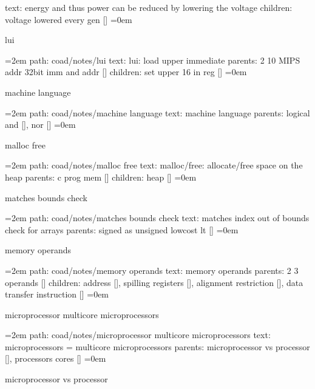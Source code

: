 text:  energy and thus power can be reduced by lowering the voltage
\smallskip
children: voltage lowered every gen []
\smallskip
\leftskip=0em
\par\endgroup
\bigskip
{}
lui
\smallskip
\par\begingroup
\leftskip=2em
path: coad/notes/lui
\smallskip
text:  lui: load upper immediate
\smallskip
parents:  2 10 MIPS addr 32bit imm and addr []
\smallskip
children: set upper 16 in reg []
\smallskip
\leftskip=0em
\par\endgroup
\bigskip
{}
machine language
\smallskip
\par\begingroup
\leftskip=2em
path: coad/notes/machine language
\smallskip
text:  machine language
\smallskip
parents:  logical and [], nor []
\smallskip
\leftskip=0em
\par\endgroup
\bigskip
{}
malloc free
\smallskip
\par\begingroup
\leftskip=2em
path: coad/notes/malloc free
\smallskip
text:  malloc/free: allocate/free space on the heap
\smallskip
parents:  c prog mem []
\smallskip
children: heap []
\smallskip
\leftskip=0em
\par\endgroup
\bigskip
{}
matches bounds check
\smallskip
\par\begingroup
\leftskip=2em
path: coad/notes/matches bounds check
\smallskip
text:  matches index out of bounds check for arrays
\smallskip
parents:  signed as unsigned lowcost lt []
\smallskip
\leftskip=0em
\par\endgroup
\bigskip
{}
memory operands
\smallskip
\par\begingroup
\leftskip=2em
path: coad/notes/memory operands
\smallskip
text:  memory operands
\smallskip
parents:  2 3 operands []
\smallskip
children: address [], spilling registers [], alignment restriction [], data transfer instruction []
\smallskip
\leftskip=0em
\par\endgroup
\bigskip
{}
microprocessor multicore microprocessors
\smallskip
\par\begingroup
\leftskip=2em
path: coad/notes/microprocessor multicore microprocessors
\smallskip
text:  microprocessors = multicore microprocessors
\smallskip
parents:  microprocessor vs processor [], processors cores []
\smallskip
\leftskip=0em
\par\endgroup
\bigskip
{}
microprocessor vs processor
